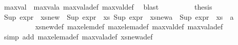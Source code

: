 \begin{isabellebody}
\ {\isacartoucheopen}max{\isacharunderscore}{\kern0pt}val\ {\isasymle}\ max{\isacharunderscore}{\kern0pt}val{\isacharunderscore}{\kern0pt}a{\isacartoucheclose}\ max{\isacharunderscore}{\kern0pt}val{\isacharunderscore}{\kern0pt}a{\isacharunderscore}{\kern0pt}def\ max{\isacharunderscore}{\kern0pt}val{\isacharunderscore}{\kern0pt}def\ \isamarkupfalse%
\ blast\isanewline
\ \ \ \ \ \ \isamarkupfalse%
\ \isamarkupfalse%
\ {\isacharquery}{\kern0pt}thesis\ \isanewline
\ \ \ \ \ \ \ \ \isamarkupfalse%
\ {\isacartoucheopen}Sup\ {\isacharparenleft}{\kern0pt}expr{\isacharunderscore}{\kern0pt}{}\ {\isacharbackquote}{\kern0pt}\ xs{\isacharunderscore}{\kern0pt}new{\isacharparenright}{\kern0pt}\ {\isacharequal}{\kern0pt}\ Sup\ {\isacharparenleft}{\kern0pt}expr{\isacharunderscore}{\kern0pt}{}\ {\isacharbackquote}{\kern0pt}\ xs{\isacharparenright}{\kern0pt}{\isacartoucheclose}\ {\isacartoucheopen}Sup\ {\isacharparenleft}{\kern0pt}expr{\isacharunderscore}{\kern0pt}{}\ {\isacharbackquote}{\kern0pt}\ xs{\isacharunderscore}{\kern0pt}new{\isacharunderscore}{\kern0pt}a{\isacharparenright}{\kern0pt}\ {\isacharequal}{\kern0pt}\ Sup\ {\isacharparenleft}{\kern0pt}expr{\isacharunderscore}{\kern0pt}{}\ {\isacharbackquote}{\kern0pt}\ {\isacharparenleft}{\kern0pt}xs\ {\isasymunion}\ {\isacharbraceleft}{\kern0pt}a{\isacharbraceright}{\kern0pt}{\isacharparenright}{\kern0pt}{\isacharparenright}{\kern0pt}{\isacartoucheclose}\isanewline
\ \ \ \ \ \ \ \ \isamarkupfalse%
\ xs{\isacharunderscore}{\kern0pt}new{\isacharunderscore}{\kern0pt}def\ max{\isacharunderscore}{\kern0pt}elem{\isacharunderscore}{\kern0pt}def\ max{\isacharunderscore}{\kern0pt}elem{\isacharunderscore}{\kern0pt}a{\isacharunderscore}{\kern0pt}def\ max{\isacharunderscore}{\kern0pt}val{\isacharunderscore}{\kern0pt}def\ max{\isacharunderscore}{\kern0pt}val{\isacharunderscore}{\kern0pt}a{\isacharunderscore}{\kern0pt}def\isanewline
\ \ \ \ \ \ \ \ \isamarkupfalse%
\ {\isacharparenleft}{\kern0pt}simp\ add{\isacharcolon}{\kern0pt}\ max{\isacharunderscore}{\kern0pt}elem{\isacharunderscore}{\kern0pt}a{\isacharunderscore}{\kern0pt}def\ max{\isacharunderscore}{\kern0pt}val{\isacharunderscore}{\kern0pt}a{\isacharunderscore}{\kern0pt}def\ xs{\isacharunderscore}{\kern0pt}new{\isacharunderscore}{\kern0pt}a{\isacharunderscore}{\kern0pt}def{\isacharparenright}{\kern0pt}\isanewline
\ \ \ \ \isamarkupfalse%
\isanewline
\ \ \ \ \ \ \isamarkupfalse%
\ {}\isanewline

\end{isabellebody}
